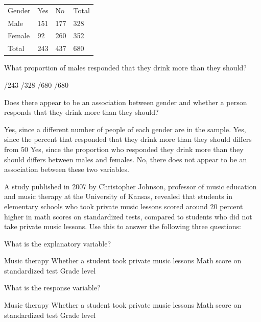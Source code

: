 \documentclass{article}
\begin{document}
\begin{mcquestions}
\begin{mcquestioninstruction}
			\begin{tabular}{llll}
				Gender & Yes                     & No  & Total  \\
				Male   & 151                     & 177 & 328    \\
				Female & 92                      & 260 & 352    \\
				Total  & 243                     & 437 & 680   
			\end{tabular}
		\end{mcquestioninstruction}
		\question What proportion of males responded that they drink more than they should?
		\begin{mcanswerslist}
			/243
			/328
			/680
			/680
		\end{mcanswerslist}
		
		\question[follow] Does there appear to be an association between gender and whether a person responds that they drink more than they should?
		\begin{mcanswerslist}
			\answer Yes, since a different number of people of each gender are in the sample.
			\answer Yes, since the percent that responded that they drink more than they should differs from 50%
			\answer[correct] Yes, since the proportion who responded they drink more than they should differs between males and females.
			\answer No, there does not appear to be an association between these two variables.
		\end{mcanswerslist}
		
		\begin{mcquestioninstruction}
			A study published in 2007 by Christopher Johnson, professor of music education and music therapy at the University of Kansas, revealed that students in elementary schools who took private music lessons scored around 20 percent higher in math scores on standardized tests, compared to students who did not take private music lessons.  Use this to answer the following three questions:
		\end{mcquestioninstruction}
		
		\question What is the explanatory variable?
		\begin{mcanswerslist}
			\answer Music therapy
			\answer[correct] Whether a student took private music lessons
			\answer Math score on standardized test
			\answer Grade level
		\end{mcanswerslist}
		
		\question[follow] What is the response variable?
		\begin{mcanswerslist}
			\answer Music therapy
			\answer Whether a student took private music lessons
			\answer[correct] Math score on standardized test
			\answer Grade level
		\end{mcanswerslist}
		

\end{mcquestions}
\end{document}
